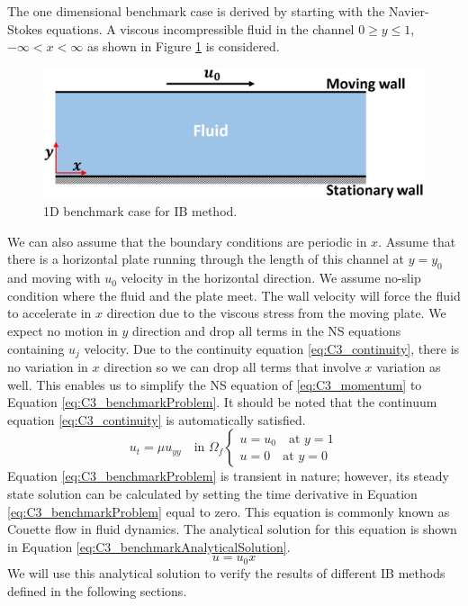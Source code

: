 The one dimensional benchmark case is derived by starting with the Navier-Stokes equations. A viscous incompressible fluid in the channel $0 \geq y \leq 1$, $-\infty < x < \infty$ as shown in Figure \ref{fig:C3_benchmarkCase} is considered.
%
\begin{figure}[H]
    \centering
    \includegraphics[width=14.00cm]{Chapter_3/figure/C3_infinite_channel.png}
    \caption{1D benchmark case for IB method.}
    \label{fig:C3_benchmarkCase}
\end{figure}
%
We can also assume that the boundary conditions are periodic in $x$. Assume that there is a horizontal plate running through the length of this channel at $y=y_0$ and moving with $u_0$ velocity in the horizontal direction. We assume no-slip condition where the fluid and the plate meet. The wall velocity will force the fluid to accelerate in $x$ direction due to the viscous stress from the moving plate. We expect no motion in $y$ direction and drop all terms in the NS equations containing $u_j$ velocity. Due to the continuity equation \eqref{eq:C3_continuity}, there is no variation in $x$ direction so we can drop all terms that involve $x$ variation as well. This enables us to simplify the NS equation of \eqref{eq:C3_momentum} to Equation \eqref{eq:C3_benchmarkProblem}. It should be noted that the continuum equation \eqref{eq:C3_continuity} is automatically satisfied.
%
\begin{subequations}\label{eq:C3_benchmarkProblem}
\begin{equation}
    u_t = \mu u_{yy} \quad \text{in } \Omega_f
\end{equation}
\begin{equation}
\begin{cases}
    u = u_0 \quad \text{at } y = 1 \\
    u = 0 \quad \text{at } y = 0
\end{cases}
\end{equation}
\end{subequations}
%
Equation \eqref{eq:C3_benchmarkProblem} is transient in nature; however, its steady state solution can be calculated by setting the time derivative in Equation \eqref{eq:C3_benchmarkProblem} equal to zero. This equation is commonly known as Couette flow in fluid dynamics. The analytical solution for this equation is shown in Equation \eqref{eq:C3_benchmarkAnalyticalSolution}.
%
\begin{equation}\label{eq:C3_benchmarkAnalyticalSolution}
    u = u_0 x
\end{equation}
%
We will use this analytical solution to verify the results of different IB methods defined in the following sections.
